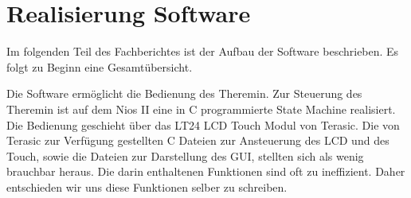 \clearpage
\section{Realisierung Software}\label{sec:Realisierung_Software}
Im folgenden Teil des Fachberichtes ist der Aufbau der Software beschrieben. Es folgt zu Beginn eine Gesamtübersicht.

Die Software ermöglicht die Bedienung des Theremin. Zur Steuerung des Theremin ist auf dem Nios II eine in C programmierte State Machine realisiert. Die Bedienung geschieht über das LT24 LCD Touch Modul von Terasic. Die von Terasic zur Verfügung gestellten C Dateien zur Ansteuerung des LCD und des Touch, sowie die Dateien zur Darstellung des GUI, stellten sich als wenig brauchbar heraus. Die darin enthaltenen Funktionen sind oft zu ineffizient. Daher entschieden wir uns diese Funktionen selber zu schreiben.